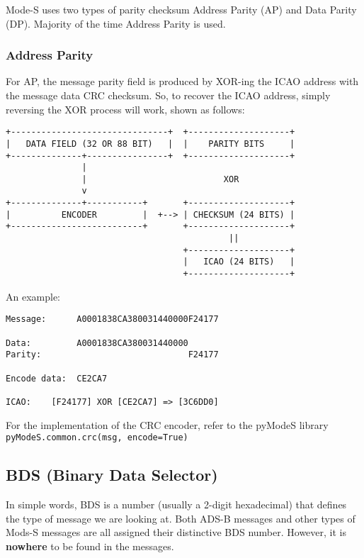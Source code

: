 Mode-S uses two types of parity checksum Address Parity (AP) and Data
Parity (DP). Majority of the time Address Parity is used.

\subsubsection{Address Parity}\label{address-parity}

For AP, the message parity field is produced by XOR-ing the ICAO address with the message
data CRC checksum. So, to recover the ICAO address, simply reversing the
XOR process will work, shown as follows:

\begin{verbatim}
+-------------------------------+  +--------------------+
|   DATA FIELD (32 OR 88 BIT)   |  |    PARITY BITS     |
+--------------+----------------+  +--------------------+
               |
               |                           XOR
               v
+--------------+-----------+       +--------------------+
|          ENCODER         |  +--> | CHECKSUM (24 BITS) |
+--------------------------+       +--------------------+
                                            ||
                                   +--------------------+
                                   |   ICAO (24 BITS)   |
                                   +--------------------+
\end{verbatim}

An example:

\begin{verbatim}
Message:      A0001838CA380031440000F24177

Data:         A0001838CA380031440000
Parity:                             F24177

Encode data:  CE2CA7

ICAO:    [F24177] XOR [CE2CA7] => [3C6DD0]
\end{verbatim}

For the implementation of the CRC encoder, refer to the pyModeS library
\texttt{pyModeS.common.crc(msg,\ encode=True)}

\subsection{BDS (Binary Data Selector)}\label{bds-comm-b-data-selector}

In simple words, BDS is a number (usually a 2-digit hexadecimal) that
defines the type of message we are looking at. Both ADS-B messages and
other types of Mods-S messages are all assigned their distinctive BDS
number. However, it is \textbf{nowhere} to be found in the messages.

